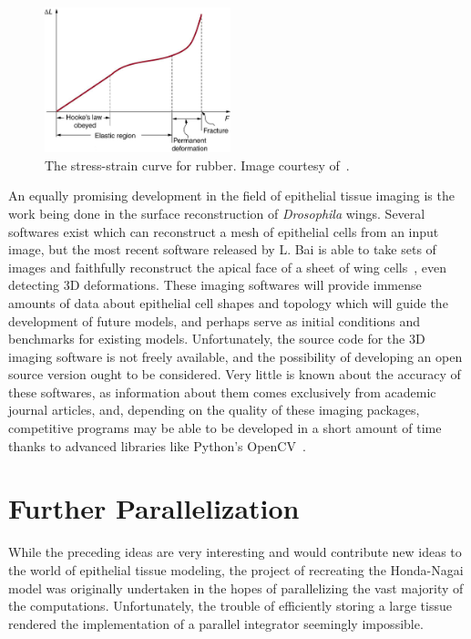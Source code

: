 \begin{figure}
  \begin{center}
    \includegraphics[width=0.48\textwidth]{../diagrams/rubber.jpeg}
  \end{center}
  \caption{The stress-strain curve for rubber. Image courtesy of~\cite{rubr}.}
\label{fig:rubber}
\end{figure}

An equally promising development in the field of epithelial tissue imaging is the work being done in the surface reconstruction of \emph{Drosophila} wings. Several softwares exist which can reconstruct a mesh of epithelial cells from an input image, but the most recent software released by L. Bai is able to take sets of images and faithfully reconstruct the apical face of a sheet of wing cells~\cite{3dwing}, even detecting 3D deformations. These imaging softwares will provide immense amounts of data about epithelial cell shapes and topology which will guide the development of future models, and perhaps serve as initial conditions and benchmarks for existing models. Unfortunately, the source code for the 3D imaging software is not freely available, and the possibility of developing an open source version ought to be considered. Very little is known about the accuracy of these softwares, as information about them comes exclusively from academic journal articles, and, depending on the quality of these imaging packages, competitive programs may be able to be developed in a short amount of time thanks to advanced libraries like Python's OpenCV~\cite{OpenCV}.

\section{Further Parallelization}
While the preceding ideas are very interesting and would contribute new ideas to the world of epithelial tissue modeling, the project of recreating the Honda-Nagai model was originally undertaken in the hopes of parallelizing the vast majority of the computations. Unfortunately, the trouble of efficiently storing a large tissue rendered the implementation of a parallel integrator seemingly impossible. 

